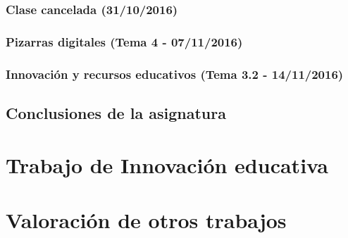 \documentclass[palatino,nochap,miniheader]{apuntesURJC}
\begin{document}
\subsection{Clase cancelada (31/10/2016)}

\subsection{Pizarras digitales (Tema 4 - 07/11/2016)}


\subsection{Innovación y recursos educativos (Tema 3.2 - 14/11/2016)}



\section{Conclusiones de la asignatura}


\chapter{Trabajo de Innovación educativa}



\chapter{Valoración de otros trabajos}








\printindex
\end{document}
